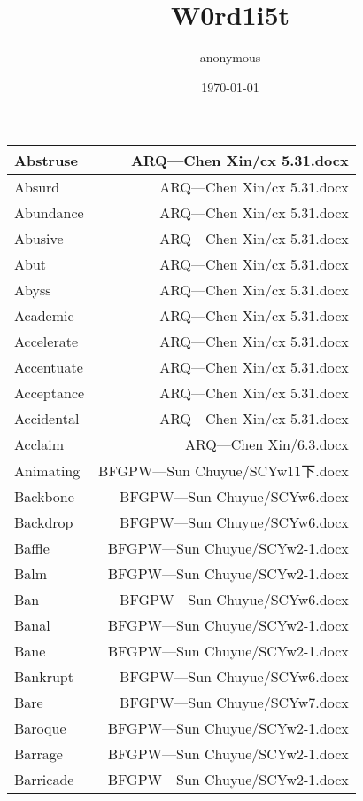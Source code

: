 \documentclass{article}
\title{W0rd1i5t}
\author{anonymous}
\date{\today}
\begin{document}
\maketitle
\begin{center}
\begin{longtable}{|l|r|}
\hline
Abstruse  &  ARQ---Chen Xin/cx 5.31.docx\\  
\hline
Absurd  &  ARQ---Chen Xin/cx 5.31.docx\\  
\hline
Abundance  &  ARQ---Chen Xin/cx 5.31.docx\\  
\hline
Abusive  &  ARQ---Chen Xin/cx 5.31.docx\\  
\hline
Abut  &  ARQ---Chen Xin/cx 5.31.docx\\  
\hline
Abyss  &  ARQ---Chen Xin/cx 5.31.docx\\  
\hline
Academic  &  ARQ---Chen Xin/cx 5.31.docx\\  
\hline
Accelerate  &  ARQ---Chen Xin/cx 5.31.docx\\  
\hline
Accentuate  &  ARQ---Chen Xin/cx 5.31.docx\\  
\hline
Acceptance  &  ARQ---Chen Xin/cx 5.31.docx\\  
\hline
Accidental  &  ARQ---Chen Xin/cx 5.31.docx\\  
\hline
Acclaim  &  ARQ---Chen Xin/6.3.docx\\  
\hline
Animating  &  BFGPW---Sun Chuyue/SCYw11下.docx\\  
\hline
Backbone  &  BFGPW---Sun Chuyue/SCYw6.docx\\  
\hline
Backdrop  &  BFGPW---Sun Chuyue/SCYw6.docx\\  
\hline
Baffle  &  BFGPW---Sun Chuyue/SCYw2-1.docx\\  
\hline
Balm  &  BFGPW---Sun Chuyue/SCYw2-1.docx\\  
\hline
Ban  &  BFGPW---Sun Chuyue/SCYw6.docx\\  
\hline
Banal  &  BFGPW---Sun Chuyue/SCYw2-1.docx\\  
\hline
Bane  &  BFGPW---Sun Chuyue/SCYw2-1.docx\\  
\hline
Bankrupt  &  BFGPW---Sun Chuyue/SCYw6.docx\\  
\hline
Bare  &  BFGPW---Sun Chuyue/SCYw7.docx\\  
\hline
Baroque  &  BFGPW---Sun Chuyue/SCYw2-1.docx\\  
\hline
Barrage  &  BFGPW---Sun Chuyue/SCYw2-1.docx\\  
\hline
Barricade  &  BFGPW---Sun Chuyue/SCYw2-1.docx\\  

\end{longtable}
\end{center}
\end{document}
